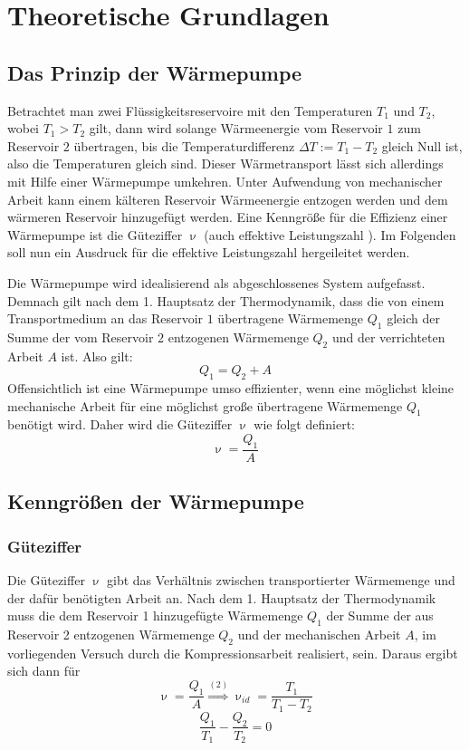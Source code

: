 \section{Theoretische Grundlagen}
\label{sec:Theorie}

\subsection{Das Prinzip der Wärmepumpe}
Betrachtet man zwei Flüssigkeitsreservoire mit den Temperaturen $T_1$ und $T_2$, wobei $T_1 > T_2$ gilt, dann wird solange Wärmeenergie vom Reservoir $1$ zum Reservoir $2$ übertragen, bis die Temperaturdifferenz $\Delta T := T_1 - T_2$ gleich Null ist, also die Temperaturen gleich sind.
Dieser Wärmetransport lässt sich allerdings mit Hilfe einer Wärmepumpe umkehren. Unter Aufwendung von mechanischer Arbeit kann einem kälteren Reservoir Wärmeenergie entzogen werden und dem wärmeren Reservoir hinzugefügt werden.
Eine Kenngröße für die Effizienz einer Wärmepumpe ist die Güteziffer $\upnu$ (auch effektive Leistungszahl \cite{geschke}). Im Folgenden soll nun ein Ausdruck für die effektive Leistungszahl hergeileitet werden.

Die Wärmepumpe wird idealisierend als abgeschlossenes System aufgefasst.
Demnach gilt nach dem 1. Hauptsatz der Thermodynamik, dass die von einem Transportmedium an das Reservoir $1$ übertragene Wärmemenge $Q_1$ gleich der Summe der vom Reservoir $2$ entzogenen Wärmemenge $Q_2$ und der verrichteten Arbeit $A$ ist. Also gilt:
\begin{equation}
	Q_1 = Q_2 + A
\end{equation}
Offensichtlich ist eine Wärmepumpe umso effizienter, wenn eine möglichst kleine mechanische Arbeit für eine möglichst große übertragene Wärmemenge $Q_1$ benötigt wird. Daher wird die Güteziffer $\upnu$ wie folgt definiert:
\begin{equation}
	\upnu = \frac{Q_1}{A}
\end{equation}


\subsection{Kenngrößen der Wärmepumpe}
\subsubsection {Güteziffer}
\label{sec:güteziffer}
Die Güteziffer $\upnu$ gibt das Verhältnis zwischen transportierter Wärmemenge und der dafür benötigten Arbeit an. Nach dem 1. Hauptsatz der Thermodynamik muss die dem Reservoir 1 hinzugefügte Wärmemenge $Q_1$
der Summe der aus Reservoir 2 entzogenen Wärmemenge $Q_2$ und der mechanischen Arbeit $A$, im vorliegenden Versuch durch die Kompressionsarbeit realisiert, sein.
Daraus ergibt sich dann für
\begin{equation}
  \label{eqn:equation1}
  \upnu=\frac{Q_1}{A}\stackrel{(2)}{\Rightarrow} \upnu_{id}=\frac{T_1}{T_1-T_2}
\end{equation}
\begin{equation}
  \frac{Q_1}{T_1}-\frac{Q_2}{T_2}=0\label{eqn:equation2}
\end{equation}

